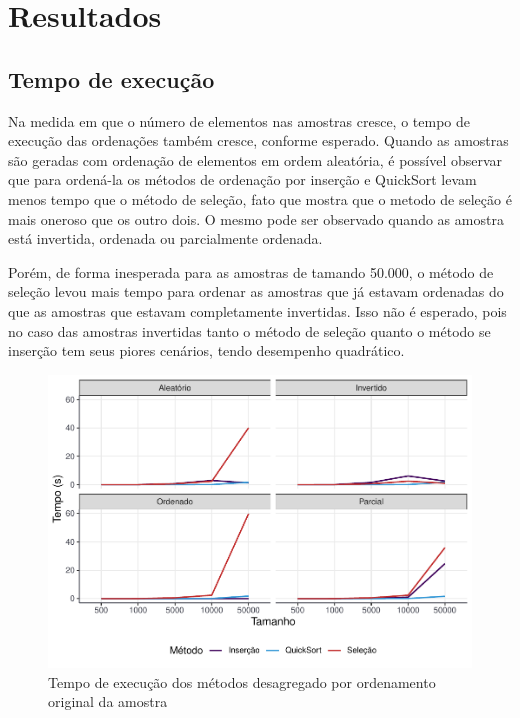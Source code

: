 \documentclass[
]{article}
\begin{document}
\hypertarget{resultados}{%
\section{Resultados}\label{resultados}}

\hypertarget{tempo-de-execuuxe7uxe3o}{%
\subsection{Tempo de execução}\label{tempo-de-execuuxe7uxe3o}}

Na medida em que o número de elementos nas amostras cresce, o tempo de
execução das ordenações também cresce, conforme esperado. Quando as
amostras são geradas com ordenação de elementos em ordem aleatória, é
possível observar que para ordená-la os métodos de ordenação por
inserção e QuickSort levam menos tempo que o método de seleção, fato que
mostra que o metodo de seleção é mais oneroso que os outro dois. O mesmo
pode ser observado quando as amostra está invertida, ordenada ou
parcialmente ordenada.

Porém, de forma inesperada para as amostras de tamando 50.000, o método
de seleção levou mais tempo para ordenar as amostras que já estavam
ordenadas do que as amostras que estavam completamente invertidas. Isso
não é esperado, pois no caso das amostras invertidas tanto o método de
seleção quanto o método se inserção tem seus piores cenários, tendo
desempenho quadrático.

\begin{figure}

{\centering \includegraphics[width=0.75\linewidth]{relatorio_tp1_2_files/figure-latex/grafico-tempo-1} 

}

\caption{Tempo de execução dos métodos desagregado por ordenamento original da amostra}\label{fig:grafico-tempo}
\end{figure}
\end{document}
